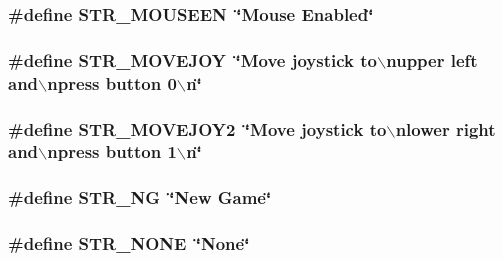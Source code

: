 \label{FOREIGN_8H_a24089f18d52979d101c27f9a76f17758}
\hypertarget{FOREIGN_8H_afb23262dc35db01b91088ffe345a878c}{
\subsubsection[{STR\_\-MOUSEEN}]{\setlength{\rightskip}{0pt plus 5cm}\#define STR\_\-MOUSEEN~\char`\"{}Mouse Enabled\char`\"{}}}
\label{FOREIGN_8H_afb23262dc35db01b91088ffe345a878c}
\hypertarget{FOREIGN_8H_a8ee4fd386c1c7bcb7a57c5b46f18b759}{
\subsubsection[{STR\_\-MOVEJOY}]{\setlength{\rightskip}{0pt plus 5cm}\#define STR\_\-MOVEJOY~\char`\"{}Move joystick to$\backslash$nupper left and$\backslash$npress button 0$\backslash$n\char`\"{}}}
\label{FOREIGN_8H_a8ee4fd386c1c7bcb7a57c5b46f18b759}
\hypertarget{FOREIGN_8H_a808f57eb43733c506858ea7ea48a0ce6}{
\subsubsection[{STR\_\-MOVEJOY2}]{\setlength{\rightskip}{0pt plus 5cm}\#define STR\_\-MOVEJOY2~\char`\"{}Move joystick to$\backslash$nlower right and$\backslash$npress button 1$\backslash$n\char`\"{}}}
\label{FOREIGN_8H_a808f57eb43733c506858ea7ea48a0ce6}
\hypertarget{FOREIGN_8H_ae8feade9fb6b352bf820da5cdcb63fa7}{
\subsubsection[{STR\_\-NG}]{\setlength{\rightskip}{0pt plus 5cm}\#define STR\_\-NG~\char`\"{}New Game\char`\"{}}}
\label{FOREIGN_8H_ae8feade9fb6b352bf820da5cdcb63fa7}
\hypertarget{FOREIGN_8H_afe31e7691d6ff56f21f4762bf899af2d}{
\subsubsection[{STR\_\-NONE}]{\setlength{\rightskip}{0pt plus 5cm}\#define STR\_\-NONE~\char`\"{}None\char`\"{}}}
